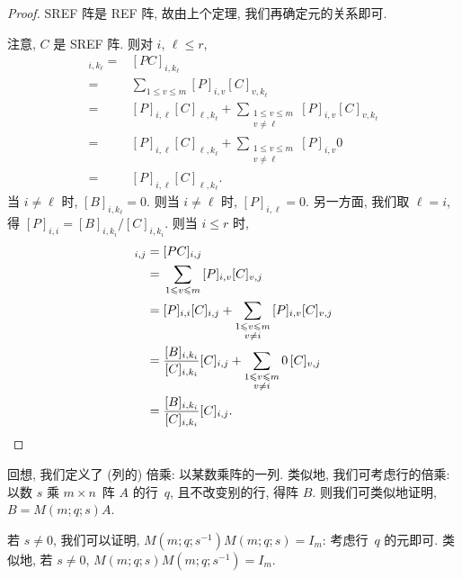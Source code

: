\documentclass[../libro.tex]{subfiles}
\begin{document}
\begin{proof}
    SREF 阵是 REF 阵,
    故由上个定理, 我们再确定元的关系即可.

    注意, \(C\) 是 SREF 阵.
    则对 \(i\), \(\ell \leq r\),
    \begin{align*}
        [B]_{i,k_\ell}
        = {} &
        [P C]_{i,k_\ell}
        \\
        = {} &
        \sum_{1 \leq v \leq m}
        {[P]_{i,v} [C]_{v,k_\ell}}
        \\
        = {} &
        [P]_{i,\ell} [C]_{\ell,k_\ell}
        +
        \sum_{\substack{1 \leq v \leq m \\ v \neq \ell}}
        {[P]_{i,v} [C]_{v,k_\ell}}
        \\
        = {} &
        [P]_{i,\ell} [C]_{\ell,k_\ell}
        +
        \sum_{\substack{1 \leq v \leq m \\ v \neq \ell}}
        {[P]_{i,v} 0}
        \\
        = {} &
        [P]_{i,\ell} [C]_{\ell,k_\ell}.
    \end{align*}
    当 \(i \neq \ell\) 时, \([B]_{i,k_\ell} = 0\).
    则当 \(i \neq \ell\) 时, \([P]_{i,\ell} = 0\).
    另一方面, 我们取 \(\ell = i\),
    得 \([P]_{i,i} = [B]_{i,k_i} / [C]_{i,k_i}\).
    则当 \(i \leq r\) 时,
    \begin{align*}
        [B]_{i,j}
        = {} &
        [P C]_{i,j}
        \\
        = {} &
        \sum_{1 \leq v \leq m}
        {[P]_{i,v} [C]_{v,j}}
        \\
        = {} &
        [P]_{i,i} [C]_{i,j}
        +
        \sum_{\substack{1 \leq v \leq m \\ v \neq i}}
        {[P]_{i,v} [C]_{v,j}}
        \\
        = {} &
        \frac{[B]_{i,k_i}}{[C]_{i,k_i}}
        [C]_{i,j}
        +
        \sum_{\substack{1 \leq v \leq m \\ v \neq i}}
        {0\, [C]_{v,j}}
        \\
        = {} &
        \frac{[B]_{i,k_i}}{[C]_{i,k_i}}
        [C]_{i,j}.
        \qedhere
    \end{align*}
\end{proof}

回想, 我们定义了 (列的) 倍乘:
以某数乘阵的一列.
类似地, 我们可考虑行的倍乘:
以数 \(s\) 乘 \(m \times n\)~阵 \(A\) 的行~\(q\),
且不改变别的行, 得阵 \(B\).
则我们可类似地证明,
\(B = M(m; q; s) A\).

若 \(s \neq 0\), 我们可以证明,
\(M(m; q; s^{-1}) M(m; q; s) = I_m\):
考虑行~\(q\) 的元即可.
类似地, 若 \(s \neq 0\),
\(M(m; q; s) M(m; q; s^{-1}) = I_m\).
\end{document}
